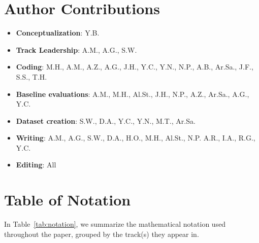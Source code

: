 \documentclass{article}
\theoremstyle{plain}
\theoremstyle{definition}
\theoremstyle{remark}
\newcommand{\arxiv}[1]{#1}
\begin{document}
\arxiv{
\section*{Author Contributions}
\begin{itemize}[noitemsep]
    \item \textbf{Conceptualization}: Y.B.
    \item \textbf{Track Leadership}: A.M., A.G., S.W.
    \item \textbf{Coding}: M.H., A.M., A.Z., A.G., J.H., Y.C., Y.N., N.P., A.B., Ar.Sa., J.F., S.S., T.H.
    \item \textbf{Baseline evaluations}: A.M., M.H., Al.St., J.H., N.P., A.Z., Ar.Sa., A.G., Y.C.
    \item \textbf{Dataset creation}: S.W., D.A., Y.C., Y.N., M.T., Ar.Sa.
    \item \textbf{Writing}: A.M., A.G., S.W., D.A., H.O., M.H., Al.St., N.P. A.R., I.A., R.G., Y.C.
    \item \textbf{Editing}: All
\end{itemize}
}





\newpage
\appendix
\onecolumn


\section{Table of Notation}
In Table~\ref{tab:notation}, we summarize the mathematical notation used throughout the paper, grouped by the track(s) they appear in.
\end{document}
